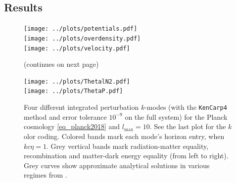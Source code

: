 \documentclass[10pt,a4paper]{article}
\begin{document}
\subsection{Results}

\begin{figure}[ht!]

\centering
\texttt{[image: ../plots/potentials.pdf]} \\
\texttt{[image: ../plots/overdensity.pdf]} \\
\texttt{[image: ../plots/velocity.pdf]} \\
\caption{(continues on next page)}
\end{figure}
\begin{figure}[ht!]\ContinuedFloat
\centering
\texttt{[image: ../plots/ThetalN2.pdf]} \\
\texttt{[image: ../plots/ThetaP.pdf]} \\
\caption{%
	Four different integrated perturbation $k$-modes (with the \texttt{KenCarp4} method and error tolerance $10^{-9}$ on the full system) for the Planck cosmology \eqref{eq_planck2018} and $l_\text{max}=10$.
	See the last plot for the $k$olor coding.
	Colored bands mark each mode's horizon entry, when $k c \eta = 1$.
	Grey vertical bands mark radiation-matter equality, recombination and matter-dark energy equality (from left to right).
	Grey curves show approximate analytical solutions in various regimes from \cite[equations (8.22), (8.31), (8.46), (8.52) and (8.64)]{dodelsonModernCosmology2021}.
}
\label{fig_perturb_all}
\end{figure}%
\end{document}

